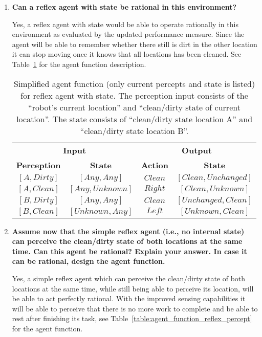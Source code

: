 \begin{enumerate}
\begin{enumerate}
\item \textbf{Can a reflex agent with state be rational in this environment?}

Yes, a reflex agent with state would be able to operate rationally in this environment as evaluated by the updated performance measure. Since the agent will be able to remember whether there still is dirt in the other location it can stop moving once it knows that all locations has been cleaned. See Table~\ref{table:agent_function_reflex_state} for the agent function description.

\begin{table}
\begin{center}
\begin{tabular}{cc|cc}
\multicolumn{2}{c|}{\bfseries{Input}} & \multicolumn{2}{c}{\bfseries{Output}}\\
\bfseries{Perception} & \bfseries{State} & \bfseries{Action} & \bfseries{State}\\
\hline
$\mathit{[A, Dirty]}$ & $\mathit{[Any, Any]}$ & $\mathit{Clean}$ & $\mathit{[Clean, Unchanged]}$ \\
$\mathit{[A, Clean]}$ & $\mathit{[Any, Unknown]}$ & $\mathit{Right}$ & $\mathit{[Clean, Unknown]}$ \\
$\mathit{[B, Dirty]}$ & $\mathit{[Any, Any]}$ & $\mathit{Clean}$ & $\mathit{[Unchanged, Clean]}$ \\
$\mathit{[B, Clean]}$ & $\mathit{[Unknown, Any]}$ & $\mathit{Left}$ & $\mathit{[Unknown, Clean]}$ \\
\end{tabular}
\caption{Simplified agent function (only current percepts and state is listed) for reflex agent with state. The perception input consists of the ``robot's current location'' and ``clean/dirty state of current location''. The state consists of ``clean/dirty state location A'' and ``clean/dirty state location B''. }
\label{table:agent_function_reflex_state}
\end{center}
\end{table}

\item \textbf{Assume now that the simple reflex agent (i.e., no internal state) can perceive the clean/dirty state of both locations at the same time. Can this agent be rational? Explain your answer. In case it can be rational, design the agent function.}

Yes, a simple reflex agent which can perceive the clean/dirty state of both locations at the same time, while still being able to perceive its location, will be able to act perfectly rational. With the improved sensing capabilities it will be able to perceive that there is no more work to complete and be able to rest after finishing its task, see Table~\ref{table:agent_function_reflex_percept} for the agent function.


\end{enumerate}
\end{enumerate}
